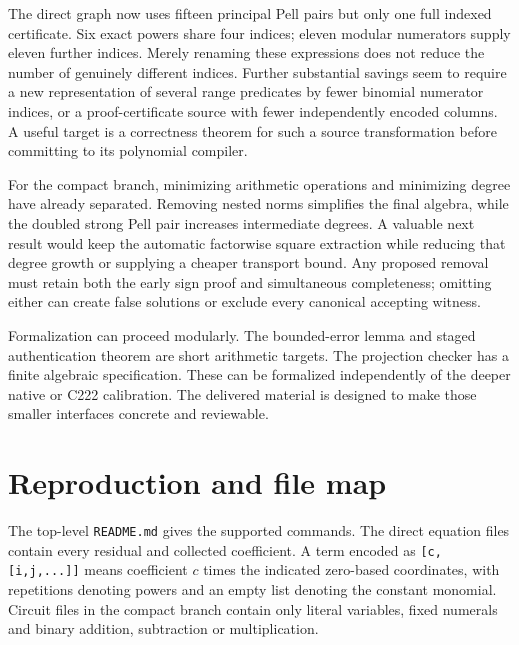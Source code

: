 \documentclass[11pt]{article}
\theoremstyle{definition}\newtheorem{definition}[theorem]{Definition}
\theoremstyle{remark}\newtheorem{remark}[theorem]{Remark}
\newcommand{\code}[1]{\nolinkurl{#1}}
\begin{document}
The direct graph now uses fifteen principal Pell pairs but only one full indexed certificate. Six exact powers share four indices; eleven modular numerators supply eleven further indices. Merely renaming these expressions does not reduce the number of genuinely different indices. Further substantial savings seem to require a new representation of several range predicates by fewer binomial numerator indices, or a proof-certificate source with fewer independently encoded columns. A useful target is a correctness theorem for such a source transformation before committing to its polynomial compiler.

For the compact branch, minimizing arithmetic operations and minimizing degree have already separated. Removing nested norms simplifies the final algebra, while the doubled strong Pell pair increases intermediate degrees. A valuable next result would keep the automatic factorwise square extraction while reducing that degree growth or supplying a cheaper transport bound. Any proposed removal must retain both the early sign proof and simultaneous completeness; omitting either can create false solutions or exclude every canonical accepting witness.

Formalization can proceed modularly. The bounded-error lemma and staged authentication theorem are short arithmetic targets. The projection checker has a finite algebraic specification. These can be formalized independently of the deeper native or C222 calibration. The delivered material is designed to make those smaller interfaces concrete and reviewable.

\section*{Reproduction and file map}

The top-level \code{README.md} gives the supported commands. The direct equation files contain every residual and collected coefficient. A term encoded as \code{[c,[i,j,...]]} means coefficient $c$ times the indicated zero-based coordinates, with repetitions denoting powers and an empty list denoting the constant monomial. Circuit files in the compact branch contain only literal variables, fixed numerals and binary addition, subtraction or multiplication.
\end{document}
